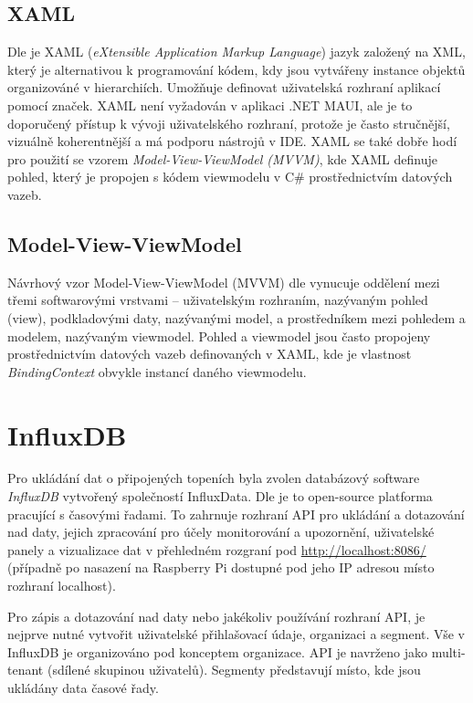 \subsection{XAML}
Dle \cite{xaml} je XAML ({\it eXtensible Application Markup Language}) jazyk založený na XML, který je alternativou k programování kódem, kdy jsou vytvářeny instance objektů organizováné v hierarchiích. Umožňuje definovat uživatelská rozhraní aplikací pomocí značek. XAML není vyžadován v aplikaci .NET MAUI, ale je to doporučený přístup k vývoji uživatelského rozhraní, protože je často stručnější, vizuálně koherentnější a má podporu nástrojů v IDE. XAML se také dobře hodí pro použití se vzorem {\it Model-View-ViewModel (MVVM)}, kde XAML definuje pohled, který je propojen s kódem viewmodelu v C\# prostřednictvím datových vazeb.

\subsection{Model-View-ViewModel}
Návrhový vzor Model-View-ViewModel (MVVM) dle \cite{mvvm} vynucuje oddělení mezi třemi softwarovými vrstvami – uživatelským rozhraním, nazývaným pohled (view), podkladovými daty, nazývanými model, a prostředníkem mezi pohledem a modelem, nazývaným viewmodel. Pohled a viewmodel jsou často propojeny prostřednictvím datových vazeb definovaných v XAML, kde je vlastnost {\it BindingContext} obvykle instancí daného viewmodelu.



\section{InfluxDB}
Pro ukládání dat o připojených topeních byla zvolen databázový software {\it InfluxDB} vytvořený společností InfluxData. Dle \cite{influx_gh} je to open-source platforma pracující s časovými řadami. To zahrnuje rozhraní API pro ukládání a dotazování nad daty, jejich zpracování pro účely monitorování a upozornění, uživatelské panely a vizualizace dat v přehledném rozgraní pod \url{http://localhost:8086/} (případně po nasazení na Raspberry Pi dostupné pod jeho IP adresou místo rozhraní localhost).

Pro zápis a dotazování nad daty nebo jakékoliv používání rozhraní API, je nejprve nutné vytvořit uživatelské přihlašovací údaje, organizaci a segment. Vše v InfluxDB je organizováno pod konceptem organizace. API je navrženo jako multi-tenant (sdílené skupinou uživatelů). Segmenty představují místo, kde jsou ukládány data časové řady.

